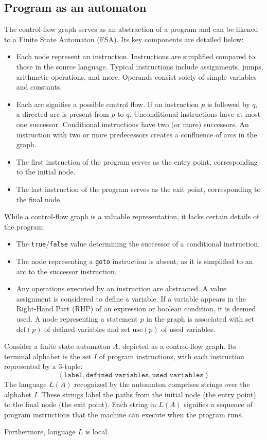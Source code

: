 \subsection{Program as an automaton}
The control-flow graph serves as an abstraction of a program and can be likened to a Finite State Automaton (FSA). Its key components are detailed below:
\begin{itemize}
    \item Each node represent an instruction. 
        Instructions are simplified compared to those in the source language.
        Typical instructions include assignments, jumps, arithmetic operations, and more.
        Operands consist solely of simple variables and constants.
    \item Each arc signifies a possible control flow. 
        If an instruction $p$ is followed by $q$, a directed arc is present from $p$ to $q$.
        Unconditional instructions have at most one successor.
        Conditional instructions have two (or more) successors.
        An instruction with two or more predecessors creates a confluence of arcs in the graph.
    \item The first instruction of the program serves as the entry point, corresponding to the initial node.
    \item The last instruction of the program serves as the exit point, corresponding to the final node.
\end{itemize}
While a control-flow graph is a valuable representation, it lacks certain details of the program:
\begin{itemize}
  \item The \texttt{true}/\texttt{false} value determining the successor of a conditional instruction.
  \item The node representing a \texttt{goto} instruction is absent, as it is simplified to an arc to the successor instruction.
  \item Any operations executed by an instruction are abstracted. 
    A value assignment is considered to define a variable.
    If a variable appears in the Right-Hand Part (RHP) of an expression or boolean condition, it is deemed used.
    A node representing a statement $p$ in the graph is associated with set $\text{def}(p)$ of defined variables and set $\text{use}(p)$ of used variables. 
\end{itemize}
\begin{definition}
    Consider a finite state automaton $A$, depicted as a control-flow graph.
     Its terminal alphabet is the set $I$ of program instructions, with each instruction represented by a $3$-tuple:
    \[ \left\langle \texttt{label}, \texttt{defined variables}, \texttt{used variables} \right\rangle \]
    The language $L(A)$ recognized by the automaton comprises strings over the alphabet $I$. 
    These strings label the paths from the initial node (the entry point) to the final node (the exit point).
    Each string in $L(A)$ signifies a sequence of program instructions that the machine can execute when the program runs.
\end{definition}
Furthermore, language $L$ is local.


